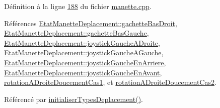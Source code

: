 Définition à la ligne \hyperlink{manette_8cpp_source_l00188}{188} du fichier \hyperlink{manette_8cpp_source}{manette.\+cpp}.



Références \hyperlink{manette_8h_source_l00185}{Etat\+Manette\+Deplacement\+::gachette\+Bas\+Droit}, \hyperlink{manette_8h_source_l00184}{Etat\+Manette\+Deplacement\+::gachette\+Bas\+Gauche}, \hyperlink{manette_8h_source_l00183}{Etat\+Manette\+Deplacement\+::joystick\+Gauche\+A\+Droite}, \hyperlink{manette_8h_source_l00182}{Etat\+Manette\+Deplacement\+::joystick\+Gauche\+A\+Gauche}, \hyperlink{manette_8h_source_l00181}{Etat\+Manette\+Deplacement\+::joystick\+Gauche\+En\+Arriere}, \hyperlink{manette_8h_source_l00180}{Etat\+Manette\+Deplacement\+::joystick\+Gauche\+En\+Avant}, \hyperlink{manette_8h_source_l00231}{rotation\+A\+Droite\+Doucement\+Cas1}, et \hyperlink{manette_8h_source_l00232}{rotation\+A\+Droite\+Doucement\+Cas2}.



Référencé par \hyperlink{manette_8cpp_source_l00085}{initialiser\+Types\+Deplacement()}.


